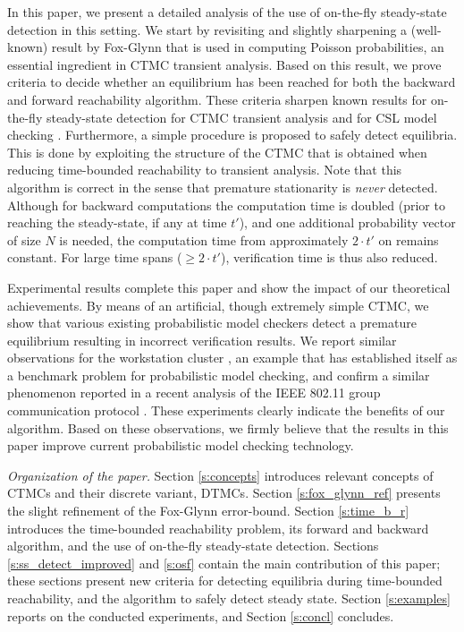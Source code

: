 \documentclass{entcs}
\begin{document}
In this paper, we present a detailed analysis of the use of on-the-fly steady-state detection in this
setting. We start by revisiting and slightly sharpening a (well-known) result by Fox-Glynn \cite{FoxG_ACM88} that is used in computing Poisson probabilities, an essential ingredient in CTMC transient analysis. Based on this result, we prove criteria to decide whether an equilibrium has been reached for both the backward and forward reachability algorithm. These criteria sharpen known results for on-the-fly steady-state detection for CTMC transient analysis \cite{MalhotraMT_MR94} and for CSL model checking \cite{YounesKNP_TACAS04,YounesKNP_STTT05}. Furthermore, a simple procedure is proposed to safely detect equilibria. This is done by exploiting the structure of the CTMC that is obtained when reducing time-bounded reachability to transient analysis. Note that this algorithm is correct in the sense that premature stationarity is \emph{never} detected. Although for backward computations the computation time is doubled (prior to reaching the steady-state, if any at time $t'$), and one additional probability vector of size $N$ is needed, the computation time from approximately $2 \cdot t'$ on remains constant. For large time spans ($\geq 2\cdot t'$), verification time is thus also reduced.

Experimental results complete this paper and show the impact of our theoretical achievements. By means of an artificial, though extremely simple CTMC, we show that various existing probabilistic model checkers detect a premature equilibrium resulting in incorrect verification results. We report similar observations for the workstation cluster \cite{HaverkortHK_SRDS00,BuchholzKKT_JLAP03,YounesKNP_TACAS04,KwiatkowskaNP_IMTTCPE02,Prism_WC05}, an example that has established itself as a benchmark problem for probabilistic model checking, and confirm a similar phenomenon reported in a recent analysis of the IEEE 802.11 group communication protocol \cite{MassinkKL_DSN04}. These experiments clearly indicate the benefits of our algorithm. Based on these observations, we firmly believe that the results in this paper improve current probabilistic model checking technology.

\emph{Organization of the paper.} 
Section \ref{s:concepts} introduces relevant concepts of CTMCs and their discrete variant, DTMCs. 
Section \ref{s:fox_glynn_ref} presents the slight refinement of the Fox-Glynn error-bound. 
Section \ref{s:time_b_r} introduces the time-bounded reachability problem, its forward and
backward algorithm, and the use of on-the-fly steady-state detection. 
Sections \ref{s:ss_detect_improved} and \ref{s:osf} contain the main contribution of this paper;
these sections present new criteria for detecting equilibria during time-bounded reachability,
and the algorithm to safely detect steady state.    
Section \ref{s:examples} reports on the conducted experiments, and Section \ref{s:concl} concludes.
\end{document}

